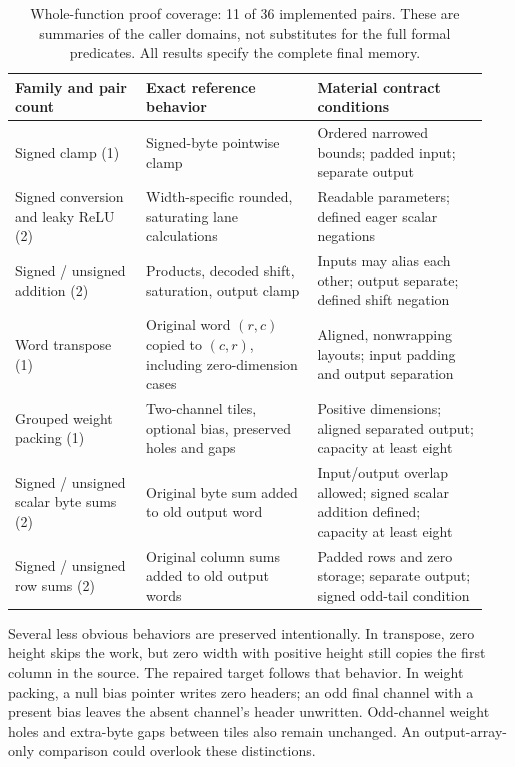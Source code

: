 \documentclass[11pt]{article}
\begin{document}
\begin{table}[htbp]
\centering\small
\begin{tabular}{@{}p{0.26\linewidth}p{0.34\linewidth}p{0.34\linewidth}@{}}
\toprule
Family and pair count & Exact reference behavior & Material contract conditions \\
\midrule
Signed clamp (1) & Signed-byte pointwise clamp & Ordered narrowed bounds; padded input; separate output \\[5pt]
Signed conversion and leaky ReLU (2) & Width-specific rounded, saturating lane calculations & Readable parameters; defined eager scalar negations \\[5pt]
Signed / unsigned addition (2) & Products, decoded shift, saturation, output clamp & Inputs may alias each other; output separate; defined shift negation \\[5pt]
Word transpose (1) & Original word $(r,c)$ copied to $(c,r)$, including zero-dimension cases & Aligned, nonwrapping layouts; input padding and output separation \\[5pt]
Grouped weight packing (1) & Two-channel tiles, optional bias, preserved holes and gaps & Positive dimensions; aligned separated output; capacity at least eight \\[5pt]
Signed / unsigned scalar byte sums (2) & Original byte sum added to old output word & Input/output overlap allowed; signed scalar addition defined; capacity at least eight \\[5pt]
Signed / unsigned row sums (2) & Original column sums added to old output words & Padded rows and zero storage; separate output; signed odd-tail condition \\
\bottomrule
\end{tabular}
\caption{Whole-function proof coverage: 11 of 36 implemented pairs. These are summaries of the caller domains, not substitutes for the full formal predicates. All results specify the complete final memory.}
\label{tab:coverage}
\end{table}

Several less obvious behaviors are preserved intentionally. In transpose, zero height skips the work, but zero width with positive height still copies the first column in the source. The repaired target follows that behavior. In weight packing, a null bias pointer writes zero headers; an odd final channel with a present bias leaves the absent channel's header unwritten. Odd-channel weight holes and extra-byte gaps between tiles also remain unchanged. An output-array-only comparison could overlook these distinctions.
\end{document}
